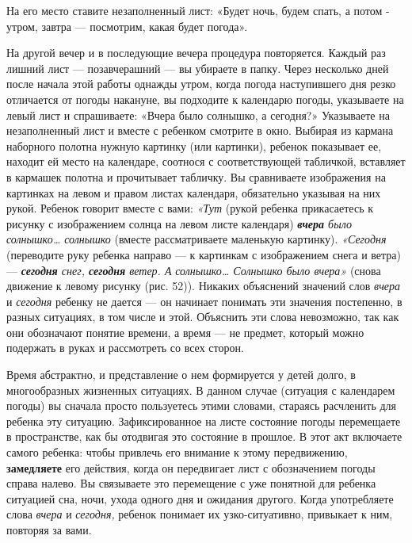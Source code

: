 \documentclass[a5paper]{book}
\renewcommand{\emph}[1]{\textit{#1}}
\begin{document}
На его место ставите незаполненный лист: «Будет ночь, будем спать, а
потом - утром, завтра --- посмотрим, какая будет погода».

На другой вечер и в последующие вечера процедура повторяется. Каждый раз
лишний лист --- позавчерашний --- вы убираете в папку. Через несколько
дней после начала этой работы однажды утром, когда погода наступившего
дня резко отличается от погоды накануне, вы подходите к календарю
погоды, указываете на левый лист и спрашиваете: «Вчера было солнышко, а
сегодня?» Указываете на незаполненный лист и вместе с ребенком смотрите
в окно. Выбирая из кармана наборного полотна нужную картинку (или
картинки), ребенок показывает ее, находит ей место на календаре,
соотнося с соответствующей табличкой, вставляет в кармашек полотна и
прочитывает табличку. Вы сравниваете изображения на картинках на левом и
правом листах календаря, обязательно указывая на них рукой. Ребенок
говорит вместе с вами: \emph{«Тут} (рукой ребенка прикасаетесь к рисунку
с изображением солнца на левом листе календаря) \emph{\textbf{вчера}
было солнышко\ldots{} солнышко} (вместе рассматриваете маленькую
картинку). \emph{«Сегодня} (переводите руку ребенка направо --- к
картинкам с изображением снега и ветра) --- \emph{\textbf{сегодня} снег,
\textbf{сегодня} ветер. А} \emph{солнышко\ldots{} Солнышко было вчера»}
(снова движение к левому рисунку (рис. 52)). Никаких объяснений значений
слов \emph{вчера} и \emph{сегодня} ребенку не дается --- он начинает
понимать эти значения постепенно, в разных ситуациях, в том числе и
этой. Объяснить эти слова невозможно, так как они обозначают понятие
времени, а время --- не предмет, который можно подержать в руках и
рассмотреть со всех сторон.

Время абстрактно, и представление о нем формируется у детей долго, в
многообразных жизненных ситуациях. В данном случае (ситуация с
календарем погоды) вы сначала просто пользуетесь этими словами, стараясь
расчленить для ребенка эту ситуацию. Зафиксированное на листе состояние
погоды перемещаете в пространстве, как бы отодвигая это состояние в
прошлое. В этот акт включаете самого ребенка: чтобы привлечь его
внимание к этому передвижению, \textbf{замедляете} его действия, когда
он передвигает лист с обозначением погоды справа налево. Вы связываете
это перемещение с уже понятной для ребенка ситуацией сна, ночи, ухода
одного дня и ожидания другого. Когда употребляете слова \emph{вчера} и
\emph{сегодня,} ребенок понимает их узко-ситуативно, привыкает к ним,
повторяя за вами.
\end{document}
